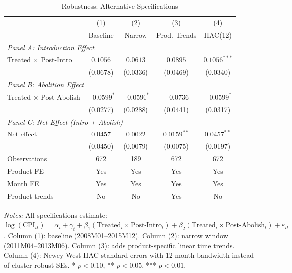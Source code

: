 \begin{table}[H]
\centering
\caption{Robustness: Alternative Specifications}
\label{tab:robustness}
\begin{threeparttable}
\begin{tabular}{lcccc}
\toprule
 & (1) & (2) & (3) & (4) \\
 & Baseline & Narrow & Prod. Trends & HAC(12) \\
\midrule
\multicolumn{5}{l}{\textit{Panel A: Introduction Effect}} \\
Treated $\times$ Post-Intro & $0.1056$ & $0.0613$ & $0.0895$ & $0.1056^{***}$ \\
 & (0.0678) & (0.0336) & (0.0469) & (0.0340) \\
[0.5em]
\multicolumn{5}{l}{\textit{Panel B: Abolition Effect}} \\
Treated $\times$ Post-Abolish & $-0.0599^{*}$ & $-0.0590^{*}$ & $-0.0736$ & $-0.0599^{*}$ \\
 & (0.0277) & (0.0288) & (0.0441) & (0.0317) \\
[0.5em]
\multicolumn{5}{l}{\textit{Panel C: Net Effect (Intro + Abolish)}} \\
Net effect & $0.0457$ & $0.0022$ & $0.0159^{**}$ & $0.0457^{**}$ \\
 & (0.0450) & (0.0079) & (0.0075) & (0.0197) \\
\midrule
Observations & 672 & 189 & 672 & 672 \\
Product FE & Yes & Yes & Yes & Yes \\
Month FE & Yes & Yes & Yes & Yes \\
Product trends & No & No & Yes & No \\
\bottomrule
\end{tabular}
\begin{tablenotes}[flushleft]
\small
\item \textit{Notes:} All specifications estimate: $\log(\text{CPI}_{it}) = \alpha_i + \gamma_t + \beta_1(\text{Treated}_i \times \text{Post-Intro}_t) + \beta_2(\text{Treated}_i \times \text{Post-Abolish}_t) + \varepsilon_{it}$. Column (1): baseline (2008M01--2015M12). Column (2): narrow window (2011M04--2013M06). Column (3): adds product-specific linear time trends. Column (4): Newey-West HAC standard errors with 12-month bandwidth instead of cluster-robust SEs. * $p<0.10$, ** $p<0.05$, *** $p<0.01$.
\end{tablenotes}
\end{threeparttable}
\end{table}

